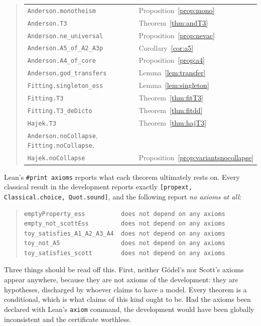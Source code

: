 \documentclass[11pt]{article}
\theoremstyle{plain}
\theoremstyle{definition}
\begin{document}
\begin{quote}
\begin{tabular}{@{}ll@{}}
\verb|Anderson.monotheism|        & Proposition~\ref{prop:mono} \\
\verb|Anderson.T3|                & Theorem~\ref{thm:andT3} \\
\verb|Anderson.ne_universal|      & Proposition~\ref{prop:nevac} \\
\verb|Anderson.A5_of_A2_A3p|      & Corollary~\ref{cor:a5} \\
\verb|Anderson.A4_of_core|        & Proposition~\ref{prop:a4} \\
\verb|Anderson.god_transfers|     & Lemma~\ref{lem:transfer} \\
\verb|Fitting.singleton_ess|      & Lemma~\ref{lem:singleton} \\
\verb|Fitting.T3|                 & Theorem~\ref{thm:fitT3} \\
\verb|Fitting.T3_deDicto|         & Theorem~\ref{thm:fitdd} \\
\verb|Hajek.T3|                   & Theorem~\ref{thm:hajT3} \\
\verb|Anderson.noCollapse|, \verb|Fitting.noCollapse|, & \\
\quad \verb|Hajek.noCollapse|     & Proposition~\ref{prop:variantsnocollapse} \\
\end{tabular}
\end{quote}

Lean's \verb|#print axioms| reports what each theorem ultimately rests on. Every
classical result in the development reports exactly
\verb|[propext, Classical.choice, Quot.sound]|, and the following report
\emph{no axioms at all}:

\begin{quote}\small
\begin{verbatim}
emptyProperty_ess          does not depend on any axioms
empty_not_scottEss         does not depend on any axioms
toy_satisfies_A1_A2_A3_A4  does not depend on any axioms
toy_not_A5                 does not depend on any axioms
toy_satisfies_scott        does not depend on any axioms
\end{verbatim}
\end{quote}

Three things should be read off this. First, neither G\"odel's nor Scott's
axioms appear anywhere, because they are not axioms of the development: they
are hypotheses, discharged by whoever claims to have a model. Every theorem is
a conditional, which is what claims of this kind ought to be. Had the axioms
been declared with Lean's \verb|axiom| command, the development would have been
globally inconsistent and the certificate worthless.
\end{document}
